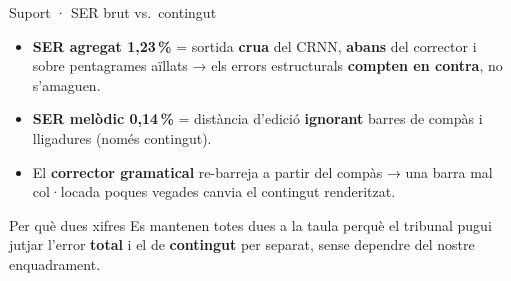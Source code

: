 \documentclass[aspectratio=169,10pt]{beamer}
\begin{document}
\begin{frame}{Suport · SER brut vs.\ contingut}
  \vspace{0.3em}
  \begin{itemize}\setlength\itemsep{0.6em}
    \item \textbf{SER agregat 1,23\,\%} = sortida \textbf{crua} del CRNN, \textbf{abans} del corrector i sobre pentagrames aïllats → els errors estructurals \textbf{compten en contra}, no s'amaguen.
    \item \textbf{SER melòdic 0,14\,\%} = distància d'edició \textbf{ignorant} barres de compàs i lligadures (només contingut).
    \item El \textbf{corrector gramatical} re-barreja a partir del compàs → una barra mal col·locada poques vegades canvia el contingut renderitzat.
  \end{itemize}
  \vspace{0.4em}
  \begin{block}{Per què dues xifres}
    {\small Es mantenen totes dues a la taula perquè el tribunal pugui jutjar l'error \textbf{total} i el de \textbf{contingut} per separat, sense dependre del nostre enquadrament.}
  \end{block}
\end{frame}
\end{document}
